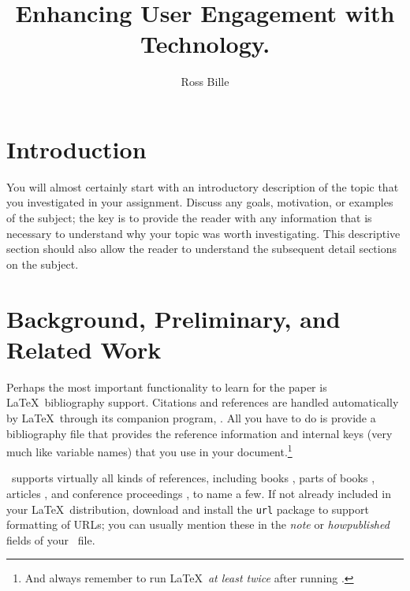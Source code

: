 \documentclass{article}
\title{Enhancing User Engagement with Technology.}
\author{Ross Bille}
\date{}
\begin{document}
\maketitle


\pagebreak
\tableofcontents

\pagebreak
\listoffigures

\pagebreak
\listoftables

\pagebreak

%
%
\section{Introduction}
\label{introduction}

You will almost certainly start with an introductory description of the topic that you investigated in your assignment.  Discuss any goals, motivation, or examples of the subject; the key is to provide the reader with any information that is necessary to understand why your topic was worth investigating.  This descriptive section should also allow the reader to understand the subsequent detail sections on the subject.

\section{Background, Preliminary, and Related Work}

Perhaps the most important functionality to learn for the paper is \LaTeX\ bibliography support.  Citations and references are handled automatically by \LaTeX\ through its companion program, \BibTeX.  All you have to do is provide a bibliography file that provides the reference information and internal keys (very much like variable names) that you use in your document.\footnote{And always remember to run \LaTeX\ \emph{at least twice} after running \BibTeX.}

\BibTeX\ supports virtually all kinds of references, including books \cite{dui,sgg,iokit,palmos}, parts of books \cite{userModeLinux}, articles \cite{nielsen:dui-review,heer-shneiderman,stackableThreads,xpkernel}, and conference proceedings \cite{ux-3d,iring,contextFileSearch,osHaskell,hibernator}, to name a few.  If not already included in your \LaTeX\ distribution, download and install the \texttt{url} package to support formatting of URLs; you can usually mention these in the \emph{note} or \emph{howpublished} fields of your \BibTeX\ file.
\end{document}
